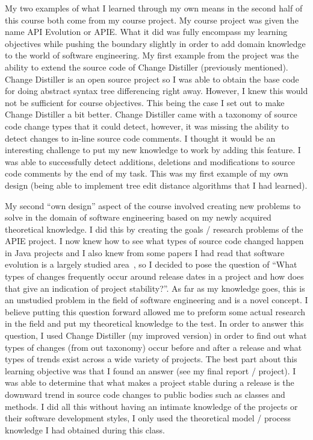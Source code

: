 \documentclass[conference]{IEEEtran}
\begin{document}
My two examples of what I learned through my own means in the second half of this course both come from my course project. My course
project was given the name API Evolution or APIE. What it did was fully encompass my learning objectives while pushing the boundary
slightly in order to add domain knowledge to the world of software engineering. My first example from the project was the ability to
extend the source code of Change Distiller (previously mentioned). Change Distiller is an open source project so I was able to obtain
the base code for doing abstract syntax tree differencing right away. However, I knew this would not be sufficient for course objectives. 
This being the case I set out to make Change Distiller a bit better. Change Distiller came with a taxonomy of source code change types that
it could detect, however, it was missing the ability to detect changes to in-line source code comments. I thought it would be an interesting
challenge to put my new knowledge to work by adding this feature. I was able to successfully detect additions, deletions and modifications
to source code comments by the end of my task. This was my first example of my own design (being able to implement tree edit distance algorithms
that I had learned).

My second ``own design'' aspect of the course involved creating new problems to solve in the domain of software engineering based on my
newly acquired theoretical knowledge. I did this by creating the goals / research problems of the APIE project. I now knew how to see what
types of source code changed happen in Java projects and I also knew from some papers I had read that software evolution is a largely studied
area~\cite{10.1109/IWPSE.2004.1334771}, so I decided to pose the question of ``What types of changes frequently occur around release dates in a project and how does that
give an indication of project stability?''. As far as my knowledge goes, this is an unstudied problem in the field of software engineering
and is a novel concept. I believe putting this question forward allowed me to preform some actual research in the field and put my theoretical
knowledge to the test. In order to answer this question, I used Change Distiller (my improved version) in order to find out what types of
changes (from out taxonomy) occur before and after a release and what types of trends exist across a wide variety of projects. The best part
about this learning objective was that I found an answer (see my final report / project). I was able to determine that what makes a project
stable during a release is the downward trend in source code changes to public bodies such as classes and methods. I did all this without
having an intimate knowledge of the projects or their software development styles, I only used the theoretical model / process knowledge
I had obtained during this class.
\end{document}
